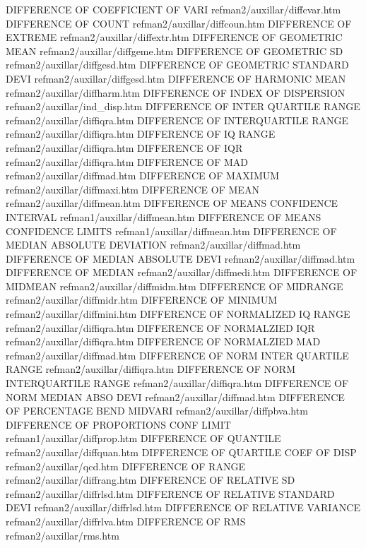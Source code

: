 DIFFERENCE OF COEFFICIENT OF VARI       refman2/auxillar/diffcvar.htm
DIFFERENCE OF COUNT                     refman2/auxillar/diffcoun.htm
DIFFERENCE OF EXTREME                   refman2/auxillar/diffextr.htm
DIFFERENCE OF GEOMETRIC MEAN            refman2/auxillar/diffgeme.htm
DIFFERENCE OF GEOMETRIC SD              refman2/auxillar/diffgesd.htm
DIFFERENCE OF GEOMETRIC STANDARD DEVI   refman2/auxillar/diffgesd.htm
DIFFERENCE OF HARMONIC MEAN             refman2/auxillar/diffharm.htm
DIFFERENCE OF INDEX OF DISPERSION       refman2/auxillar/ind_disp.htm
DIFFERENCE OF INTER QUARTILE RANGE      refman2/auxillar/diffiqra.htm
DIFFERENCE OF INTERQUARTILE RANGE       refman2/auxillar/diffiqra.htm
DIFFERENCE OF IQ RANGE                  refman2/auxillar/diffiqra.htm
DIFFERENCE OF IQR                       refman2/auxillar/diffiqra.htm
DIFFERENCE OF MAD                       refman2/auxillar/diffmad.htm
DIFFERENCE OF MAXIMUM                   refman2/auxillar/diffmaxi.htm
DIFFERENCE OF MEAN                      refman2/auxillar/diffmean.htm
DIFFERENCE OF MEANS CONFIDENCE INTERVAL refman1/auxillar/diffmean.htm
DIFFERENCE OF MEANS CONFIDENCE LIMITS   refman1/auxillar/diffmean.htm
DIFFERENCE OF MEDIAN ABSOLUTE DEVIATION refman2/auxillar/diffmad.htm
DIFFERENCE OF MEDIAN ABSOLUTE DEVI      refman2/auxillar/diffmad.htm
DIFFERENCE OF MEDIAN                    refman2/auxillar/diffmedi.htm
DIFFERENCE OF MIDMEAN                   refman2/auxillar/diffmidm.htm
DIFFERENCE OF MIDRANGE                  refman2/auxillar/diffmidr.htm
DIFFERENCE OF MINIMUM                   refman2/auxillar/diffmini.htm
DIFFERENCE OF NORMALIZED IQ RANGE       refman2/auxillar/diffiqra.htm
DIFFERENCE OF NORMALZIED IQR            refman2/auxillar/diffiqra.htm
DIFFERENCE OF NORMALZIED MAD            refman2/auxillar/diffmad.htm
DIFFERENCE OF NORM INTER QUARTILE RANGE refman2/auxillar/diffiqra.htm
DIFFERENCE OF NORM INTERQUARTILE RANGE  refman2/auxillar/diffiqra.htm
DIFFERENCE OF NORM MEDIAN ABSO DEVI     refman2/auxillar/diffmad.htm
DIFFERENCE OF PERCENTAGE BEND MIDVARI   refman2/auxillar/diffpbva.htm
DIFFERENCE OF PROPORTIONS CONF LIMIT    refman1/auxillar/diffprop.htm
DIFFERENCE OF QUANTILE                  refman2/auxillar/diffquan.htm
DIFFERENCE OF QUARTILE COEF OF DISP     refman2/auxillar/qcd.htm
DIFFERENCE OF RANGE                     refman2/auxillar/diffrang.htm
DIFFERENCE OF RELATIVE SD               refman2/auxillar/diffrlsd.htm
DIFFERENCE OF RELATIVE STANDARD DEVI    refman2/auxillar/diffrlsd.htm
DIFFERENCE OF RELATIVE VARIANCE         refman2/auxillar/diffrlva.htm
DIFFERENCE OF RMS                       refman2/auxillar/rms.htm

